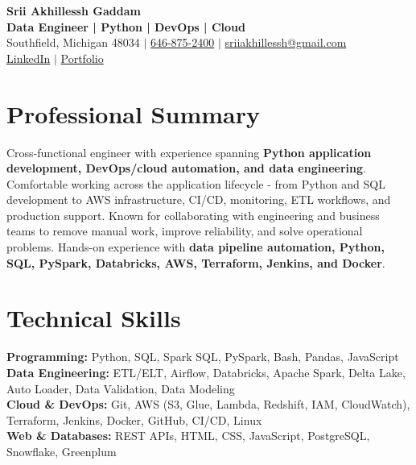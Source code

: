 \documentclass[letterpaper,10pt]{article}
\begin{document}
\fontsize{9.35pt}{10.45pt}\selectfont

\begin{center}
    {\LARGE \textbf{Srii Akhillessh Gaddam}} \\[-1pt]
    \textbf{Data Engineer | Python | DevOps | Cloud} \\[2pt]
    Southfield, Michigan 48034 $|$
    \href{tel:6468752400}{646-875-2400} $|$
    \href{mailto:sriiakhillessh@gmail.com}{sriiakhillessh@gmail.com} \\[1pt]
    \href{https://www.linkedin.com/in/srii-akhiilessh-gaddam-b48668191/}{LinkedIn} $|$
    \href{https://sriiakhillesshg.github.io/portfolio/}{Portfolio}
\end{center}
\vspace{-8pt}

\section{Professional Summary}
\small{Cross-functional engineer with experience spanning \textbf{Python application development, DevOps/cloud automation, and data engineering}. Comfortable working across the application lifecycle - from Python and SQL development to AWS infrastructure, CI/CD, monitoring, ETL workflows, and production support. Known for collaborating with engineering and business teams to remove manual work, improve reliability, and solve operational problems. Hands-on experience with \textbf{data pipeline automation, Python, SQL, PySpark, Databricks, AWS, Terraform, Jenkins, and Docker}.}

\section{Technical Skills}
\small{
\textbf{Programming:} Python, SQL, Spark SQL, PySpark, Bash, Pandas, JavaScript \\
\textbf{Data Engineering:} ETL/ELT, Airflow, Databricks, Apache Spark, Delta Lake, Auto Loader, Data Validation, Data Modeling \\
\textbf{Cloud \& DevOps:} Git, AWS (S3, Glue, Lambda, Redshift, IAM, CloudWatch), Terraform, Jenkins, Docker, GitHub, CI/CD, Linux \\
\textbf{Web \& Databases:} REST APIs, HTML, CSS, JavaScript, PostgreSQL, Snowflake, Greenplum
}

\end{document}
